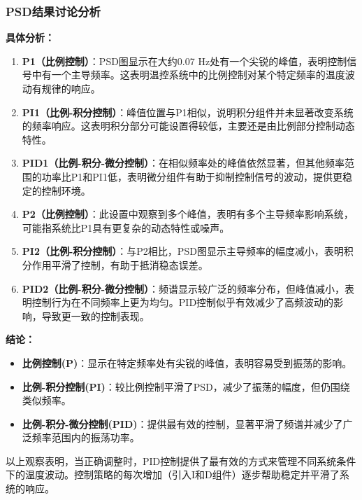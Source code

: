 \documentclass[dvipsnames, svgnames,a4paper,11pt]{article}
\begin{document}
	\subsubsection{PSD结果讨论分析}
	\textbf{具体分析：}
	\begin{enumerate}
		\item \textbf{P1（比例控制）}：PSD图显示在大约0.07 Hz处有一个尖锐的峰值，表明控制信号中有一个主导频率。这表明温控系统中的比例控制对某个特定频率的温度波动有规律的响应。
		
		\item \textbf{PI1（比例-积分控制）}：峰值位置与P1相似，说明积分组件并未显著改变系统的频率响应。这表明积分部分可能设置得较低，主要还是由比例部分控制动态特性。
		
		\item \textbf{PID1（比例-积分-微分控制）}：在相似频率处的峰值依然显著，但其他频率范围的功率比P1和PI1低，表明微分组件有助于抑制控制信号的波动，提供更稳定的控制环境。
		
		\item \textbf{P2（比例控制）}：此设置中观察到多个峰值，表明有多个主导频率影响系统，可能指系统比P1具有更复杂的动态特性或噪声。
		
		\item \textbf{PI2（比例-积分控制）}：与P2相比，PSD图显示主导频率的幅度减小，表明积分作用平滑了控制，有助于抵消稳态误差。
		
		\item \textbf{PID2（比例-积分-微分控制）}：频谱显示较广泛的频率分布，但峰值减小，表明控制行为在不同频率上更为均匀。PID控制似乎有效减少了高频波动的影响，导致更一致的控制表现。
	\end{enumerate}
	
	\textbf{结论：}
	\begin{itemize}
		\item \textbf{比例控制(P)}：显示在特定频率处有尖锐的峰值，表明容易受到振荡的影响。
		\item \textbf{比例-积分控制(PI)}：较比例控制平滑了PSD，减少了振荡的幅度，但仍围绕类似频率。
		\item \textbf{比例-积分-微分控制(PID)}：提供最有效的控制，显著平滑了频谱并减少了广泛频率范围内的振荡功率。
	\end{itemize}
	以上观察表明，当正确调整时，PID控制提供了最有效的方式来管理不同系统条件下的温度波动。控制策略的每次增加（引入I和D组件）逐步帮助稳定并平滑了系统的响应。	
	
\end{document}
